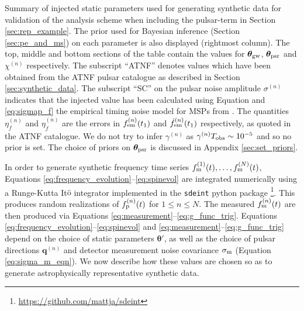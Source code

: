 \documentclass[fleqn,usenatbib,useAMS]{mnras}
\begin{document}
\begin{table}
		\caption{Summary of injected static parameters used for generating synthetic data for validation of the analysis scheme when including the pulsar-term in Section \ref{sec:rep_example}. The prior used for Bayesian inference (Section \ref{sec:pe_and_ms}) on each parameter is also displayed (rightmost column).  The top, middle and bottom sections of the table contain the values for $\boldsymbol{\theta}_{\rm gw}$, $\boldsymbol{\theta}_{\rm psr}$ and $\chi^{(n)}$ respectively. The subscript ``ATNF'' denotes values which have been obtained from the ATNF pulsar catalogue as described in Section \ref{sec:synthetic_data}. The subscript ``SC'' on the pulsar noise amplitude $\sigma^{(n)}$ indicates that the injected value has been calculated using Equation and \eqref{eq:sigmap_f} the empirical timing noise model for MSPs from \protect \cite{Shannon2010}. The quantities $\eta^{(n)}_{f}$ and $\eta^{(n)}_{\dot{f}}$ are the errors in $f^{(n)}_{\rm em} (t_1)$ and $\dot{f}^{(n)}_{\rm em} (t_1)$ respectively, as quoted in the ATNF catalogue. We do not try to infer $\gamma^{(n)}$ as $\gamma^{(n)} T_{\rm obs} \sim 10^{-5}$ and so no prior is set. The choice of priors on $\boldsymbol{\theta}_{\rm psr}$ is discussed in Appendix \ref{sec:set_priors}.
		}
		\label{tab:parameters_and_priors}
	\end{table}
In order to generate synthetic frequency time series $f_{\rm m}^{(1)}(t), \dots, f_{\rm m}^{(N)}(t)$, Equations \eqref{eq:frequency_evolution}--\eqref{eq:spinevol} are integrated numerically using a Runge-Kutta It$\hat{\text{o}}$ integrator implemented in the \texttt{sdeint} python package \footnote{\url{https://github.com/mattja/sdeint}}. This produces random realizations of $f_{\rm p}^{(n)}(t)$ for $1\leq n \leq N$. The measured $f_{\rm m}^{(n)}(t)$ are then produced via Equations \eqref{eq:measurement}--\eqref{eq:g_func_trig}. Equations \eqref{eq:frequency_evolution}--\eqref{eq:spinevol} and \eqref{eq:measurement}--\eqref{eq:g_func_trig} depend on the choice of static parameters $\boldsymbol{\theta'}$, as well as the choice of pulsar directions ${\boldsymbol{q}}^{(n)}$ and detector measurement noise covariance $\sigma_{\rm m}$ (Equation \eqref{eq:sigma_m_eqn}). We now describe how these values are chosen so as to generate astrophysically representative synthetic data. \newline 
\end{document}
